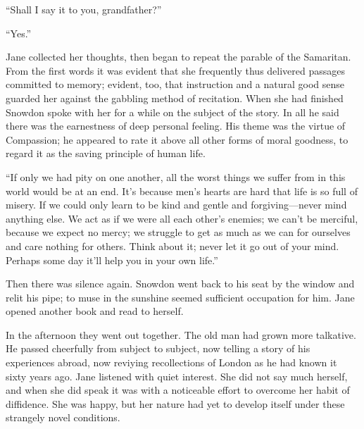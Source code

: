 ``Shall I say it to you, grandfather?''

``Yes.''

Jane collected her thoughts, then began to repeat the parable of the
Samaritan. From the first words it was evident that she frequently thus
delivered passages committed to memory; evident, too, that instruction
and a natural good sense guarded her against the gabbling method of
recitation. When she had finished Snowdon spoke with her for a while on
the subject of the story. In all he said there was {}the earnestness of
deep personal feeling. His theme was the virtue of Compassion; he
appeared to rate it above all other forms of moral goodness, to regard
it as the saving principle of human life.

``If only we had pity on one another, all the worst things we suffer
from in this world would be at an end. It's because men's hearts are
hard that life is so full of misery. If we could only learn to be kind
and gentle and forgiving---never mind anything else. We act as if we
were all each other's enemies; we can't be merciful, because we expect
no mercy; we struggle to get as much as we can for ourselves and care
nothing for others. Think about it; never let it go out of your mind.
Perhaps some day it'll help you in your own life.''

Then there was silence again. Snowdon went back to his seat by the
window and relit his pipe; to muse in the sunshine seemed sufficient
occupation for him. Jane opened another book and read to herself.

In the afternoon they went out together. {}The old man had grown more
talkative. He passed cheerfully from subject to subject, now telling a
story of his experiences abroad, now reviying recollections of London as
he had known it sixty years ago. Jane listened with quiet interest. She
did not say much herself, and when she did speak it was with a
noticeable effort to overcome her habit of diffidence. She was happy,
but her nature had yet to develop itself under these strangely novel
conditions.

